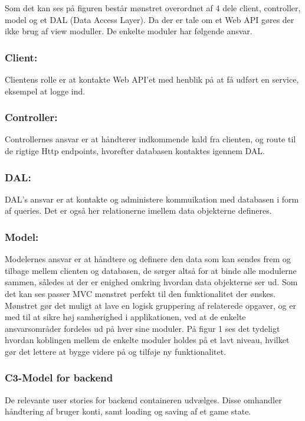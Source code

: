 Som det kan ses på figuren består mønstret overordnet af 4 dele client, controller, model og et DAL (Data Access Layer). Da der er tale om et Web API gøres der ikke brug af view moduller. De enkelte moduler har følgende ansvar.

\subsubsection{Client:}
Clientens rolle er at kontakte Web API’et med henblik på at få udført en service, eksempel at logge ind.
\subsubsection{Controller:}
Controllernes ansvar er at håndterer indkommende kald fra clienten, og route til de rigtige Http endpoints, hvorefter databasen kontaktes igennem DAL.
\subsubsection{DAL:}
DAL’s ansvar er at kontakte og administere kommuikation med databasen i form af queries. Det er også her relationerne imellem data objekterne defineres.
\subsubsection{Model:}
Modelernes ansvar er at håndtere og definere den data som kan sendes frem og tilbage mellem clienten og databasen, de sørger altså for at binde alle modulerne sammen, således at der er enighed omkring hvordan data objekterne ser ud.
Som det kan ses passer MVC mønstret perfekt til den funktionalitet der ønskes. Mønstret gør det muligt at lave en logisk gruppering af relaterede opgaver, og er med til at sikre høj samhørighed i applikationen, ved at de enkelte ansvarsområder fordeles ud på hver sine moduler. På figur 1 ses det tydeligt hvordan koblingen mellem de enkelte moduler holdes på et lavt niveau, hvilket gør det lettere at bygge videre på og tilføje ny funktionalitet.

\subsubsection{C3-Model for backend}

De relevante user stories for backend containeren udvælges. Disse omhandler håndtering af bruger konti, samt loading og saving af et game state.
 
